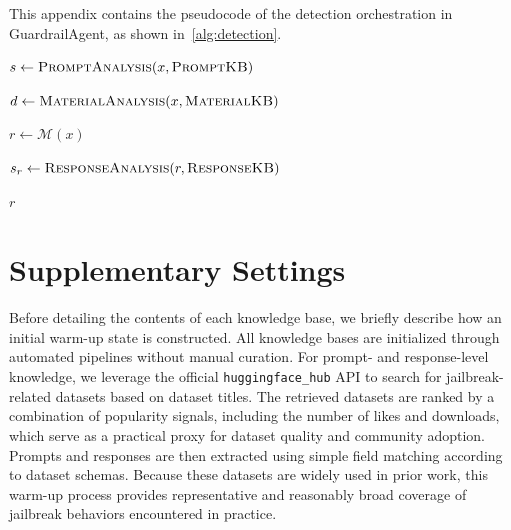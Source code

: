 \documentclass[letterpaper,twocolumn,10pt]{article}
\newcommand{\agentname}{GuardrailAgent\xspace}
\begin{document}
This appendix contains the pseudocode of the detection orchestration in \agentname, as shown in~\autoref{alg:detection}.

\label{appendix:pseudocode}

\begin{algorithm}
\caption{GuardrailAgent Detection Workflow }
\label{alg:detection}

$s \leftarrow \textnormal{\textsc{PromptAnalysis}}(x, \textnormal{\textsc{PromptKB}})$\;


$d \leftarrow \textnormal{\textsc{MaterialAnalysis}}(x, \textnormal{\textsc{MaterialKB}})$\;

$r \leftarrow \mathcal{M}(x)$\;

$s_r \leftarrow \textnormal{\textsc{ResponseAnalysis}}(r, \textnormal{\textsc{ResponseKB}})$\;

\Return $r$\;
\end{algorithm}

\section{Supplementary Settings}
\label{appendix:settings}

Before detailing the contents of each knowledge base, we briefly describe how an initial warm-up state is constructed.
All knowledge bases are initialized through automated pipelines without manual curation.
For prompt- and response-level knowledge, we leverage the official \texttt{huggingface\_hub} API to search for jailbreak-related datasets based on dataset titles.
The retrieved datasets are ranked by a combination of popularity signals, including the number of likes and downloads, which serve as a practical proxy for dataset quality and community adoption.
Prompts and responses are then extracted using simple field matching according to dataset schemas.
Because these datasets are widely used in prior work, this warm-up process provides representative and reasonably broad coverage of jailbreak behaviors encountered in practice.
\end{document}
